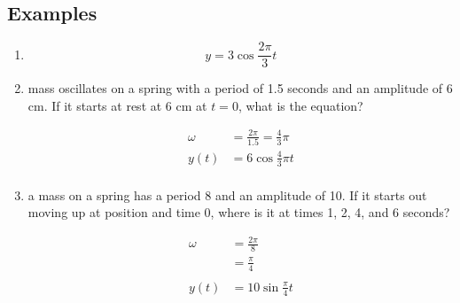 \documentclass{exam}
\begin{document}
  \subsection{Examples}
  \begin{enumerate}
    \item 
      \[
        y = 3 \cos \frac{2 \pi}{3} t
      \]

    \item mass oscillates on a spring with a period of 1.5 seconds and an amplitude of 6 cm.  
      If it starts at rest at 6 cm at $t = 0$, what is the equation?

      \begin{solution}
        \begin{align*}
          \omega & = \frac{2 \pi}{1.5} = \frac{4}{3} \pi \\
          y(t)   & = 6 \cos \frac{4}{3} \pi t \\
        \end{align*}
      \end{solution}

    \item a mass on a spring has a period 8 and an amplitude of 10.  If it starts out moving up at position and time 0,
      where is it at times 1, 2, 4, and 6 seconds?

      \begin{solution}
        \begin{align*}
          \omega & = \frac{2 \pi}{8} \\
                 & = \frac{\pi}{4} \\
          \\
          y(t)   & = 10 \sin \frac{\pi}{4} t \\
        \end{align*}


\end{solution}
\end{enumerate}
\end{document}
